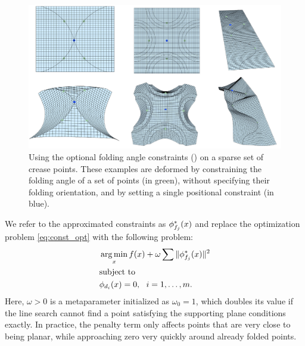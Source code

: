 \begin{figure} [h]
	\centering
	\includegraphics[width=\linewidth]{figures/dihedral_editing}
	\caption{Using the optional folding angle constraints () on a sparse set of crease points. These examples are deformed by constraining the folding angle of a set of points (in green), without specifying their folding orientation, and by setting a single positional constraint (in blue).}
	\label{fig:dihedral_editing}
\end{figure}

We refer to the approximated constraints as $\phi^*_{f_j}(x)$ and replace the optimization problem \eqref{eq:const_opt} with the following problem:
\begin{equation} \label{eq:const_opt_penalty}
\begin{aligned}
& \operatorname*{arg\,min}_x f(x) + \omega \sum \|\phi^*_{f_j}(x)\|^2 \\
& \textrm{subject to} \\
& \phi_{d_i}(x) = 0, \ \  i = 1, \ldots, m. \\ 
\end{aligned}
\end{equation}
Here, $\omega > 0$ is a metaparameter initialized as $\omega_0 = 1$, which doubles its value if the line search cannot find a point satisfying the supporting plane conditions exactly. In practice, the penalty term only affects points that are very close to being planar, while approaching zero very quickly around already folded points.

